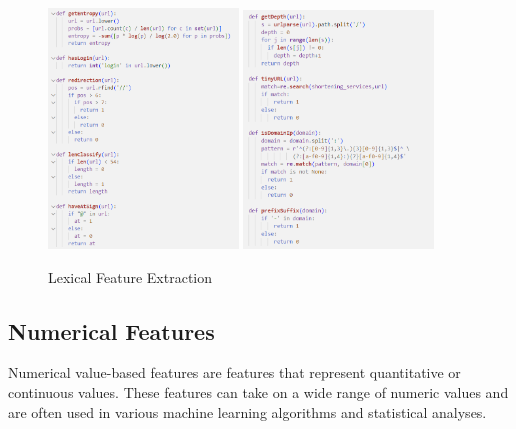 \begin{figure}[H]
  \centering
  {\includegraphics[width=0.45\textwidth]{featureExtraction_Code1.1.png}\label{fig:figure1}}
  \hfill
  {\includegraphics[width=0.450\textwidth]{featureExtraction_Code1.2.png}\label{fig:figure2}}
  \caption{Lexical Feature Extraction}
  \label{fig:bothfigures}
\end{figure}

\subsection{Numerical Features}
\par Numerical value-based features are features that represent quantitative or continuous values. These features can take on a wide range of numeric values and are often used in various machine learning algorithms and statistical analyses. 


